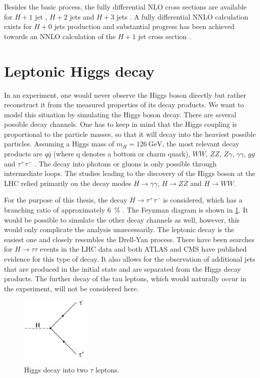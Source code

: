 Besides the basic process, the fully differential NLO cross sections are available for $H + 1$ jet \cite{gghj_nlo_fullydiff_1,gghj_nlo_fullydiff_2}, $H + 2$ jets \cite{gghjj_nlo_fullydiff_1,gghjj_nlo_fullydiff_2} and $H + 3$ jets \cite{gghjjj_nlo_fullydiff}.
A fully differential NNLO calculation exists for $H + 0$ jets production \cite{ggh_nnlo_fullydiff_1,ggh_nnlo_fullydiff_2} and substantial progress has been achieved towards an NNLO calculation of the $H + 1$ jet cross section \cite{gghj_nnlo_progress}.
%
\section{Leptonic Higgs decay}
In an experiment, one would never observe the Higgs boson directly but rather reconstruct it from the measured properties of its decay products.
We want to model this situation by simulating the Higgs boson decay.
There are several possible decay channels.
One has to keep in mind that the Higgs coupling is proportional to the particle masses, so that it will decay into the heaviest possible particles.
Assuming a Higgs mass of $m_H = \SI{126}{\giga\electronvolt}$, the most relevant decay products are $q \bar q$ (where q denotes a bottom or charm quark), $WW$, $ZZ$, $Z \gamma$, $\gamma \gamma$, $gg$ and $\tau^+ \tau^-$ \cite{higgshandbook2}.
The decay into photons or gluons is only possible through intermediate loops.
The studies leading to the discovery of the Higgs boson at the LHC relied primarily on the decay modes $H \rightarrow \gamma \gamma$, $H \rightarrow ZZ$ and $H \rightarrow WW$.

For the purpose of this thesis, the decay $H \rightarrow \tau^+ \tau^-$ is considered, which has a branching ratio of approximately \SI{6}{\percent} \cite{higgshandbook3}.
The Feynman diagram is shown in \cref{fig:h_tautau}.
It would be possible to simulate the other decay channels as well, however, this would only complicate the analysis unnecessarily.
The leptonic decay is the easiest one and closely resembles the Drell-Yan process.
There have been searches for $H \rightarrow \tau \tau$ events in the LHC data and both ATLAS \cite{htau_atlas} and CMS \cite{htau_cms} have published evidence for this type of decay.
It also allows for the observation of additional jets that are produced in the initial state and are separated from the Higgs decay products.
The further decay of the tau leptons, which would naturally occur in the experiment, will not be considered here.
%
\begin{figure}[]
	\includegraphics[width=0.3\textwidth]{images/h_tautau.pdf}
	\caption{Higgs decay into two $\tau$ leptons.}
	\label{fig:h_tautau}
\end{figure}
%
